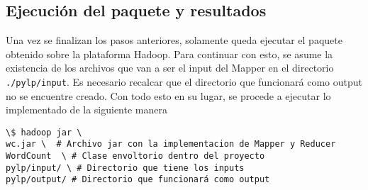 \subsection*{Ejecución del paquete y resultados}

Una vez se finalizan los pasos anteriores, solamente queda ejecutar el paquete
obtenido sobre la plataforma Hadoop. Para continuar con esto, se asume la existencia de los
archivos que van a ser el input del Mapper en el directorio {\tt ./pylp/input}.
Es necesario recalcar que el directorio que funcionará como output no se
encuentre creado. Con todo esto en su lugar, se procede a ejecutar lo
implementado de la siguiente manera

\begin{verbatim}
\$ hadoop jar \
wc.jar \  # Archivo jar con la implementacion de Mapper y Reducer
WordCount  \ # Clase envoltorio dentro del proyecto
pylp/input/ \ # Directorio que tiene los inputs
pylp/output/ # Directorio que funcionará como output
\end{verbatim}

